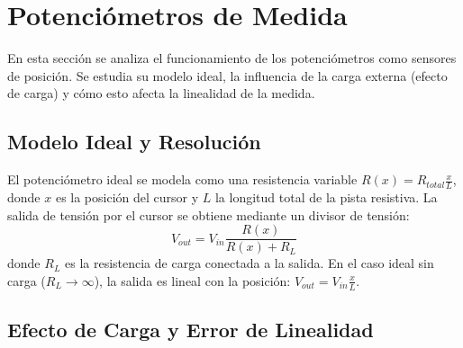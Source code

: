 \begin{marginfigure}
    \caption[Representación física de sensores resistivos.]{Representación física de sensores resistivos: (a) Potenciómetro donde la posición $x$ del cursor determina la división de tensión a través del wiper. (b) Galga extensiométrica donde la deformación longitudinal $\epsilon$ altera la resistencia del hilo metálico $\sigma$.}\label{fig:resistencia}
\end{marginfigure}



\section{Potenciómetros de Medida}\label{sec:potenciometros}

En esta sección se analiza el funcionamiento de los potenciómetros como sensores de posición. Se estudia su modelo ideal, la influencia de la carga externa (efecto de carga) y cómo esto afecta la linealidad de la medida.

\subsection{Modelo Ideal y Resolución}

El potenciómetro ideal se modela como una resistencia variable $R(x) = R_{total} \frac{x}{L}$, donde $x$ es la posición del cursor y $L$ la longitud total de la pista resistiva. La salida de tensión por el cursor se obtiene mediante un divisor de tensión: 
\begin{equation}
    V_{out} = V_{in} \frac{R(x)}{R(x) + R_L}
\end{equation}
donde $R_L$ es la resistencia de carga conectada a la salida. En el caso ideal sin carga ($R_L \to \infty$), la salida es lineal con la posición: $V_{out} = V_{in} \frac{x}{L}$.


\subsection{Efecto de Carga y Error de Linealidad}\label{sec:efecto_carga}

